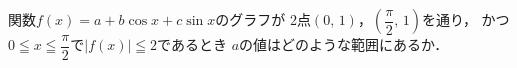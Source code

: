 \documentclass[../../main.tex]{subfiles}
\begin{document}
関数$f(x)=a+b\cos x+c\sin x$のグラフが
2点$(0, \, 1)$，$\displaystyle\left( \dfrac{\pi}{2}, \, 1 \right)$を通り，
かつ$\displaystyle 0 \leqq x \leqq \dfrac{\pi}{2}$で$|f(x)|\leqq2$であるとき
$a$の値はどのような範囲にあるか．
\end{document}
